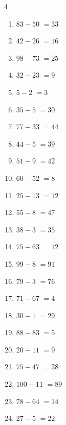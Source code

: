 \begin{multicols}{4}
\begin{enumerate}
  \item $83-50$
        $=33$

  \item $42-26$
        $=16$

  \item $98-73$
        $=25$

  \item $32-23$
        $=9$

  \item $5-2$
        $=3$

  \item $35-5$
        $=30$

  \item $77-33$
        $=44$

  \item $44-5$
        $=39$

  \item $51-9$
        $=42$

  \item $60-52$
        $=8$

  \item $25-13$
        $=12$

  \item $55-8$
        $=47$

  \item $38-3$
        $=35$

  \item $75-63$
        $=12$

  \item $99-8$
        $=91$

  \item $79-3$
        $=76$

  \item $71-67$
        $=4$

  \item $30-1$
        $=29$

  \item $88-83$
        $=5$

  \item $20-11$
        $=9$

\columnbreak %

  \item $75-47$
        $=28$

  \item $100-11$
        $=89$

  \item $78-64$
        $=14$

  \item $27-5$
        $=22$


\end{enumerate}
\end{multicols}
